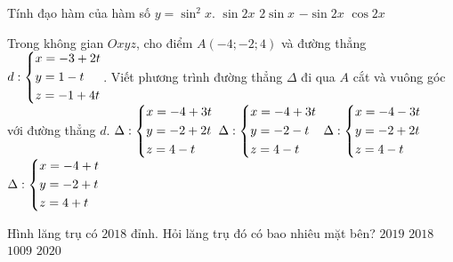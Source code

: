 \begin{ex}%
	Tính đạo hàm của hàm số $y=\sin^2x$.
	\choice
	{\True $\sin 2x$ }
	{ $2\sin x$}
	{ $-\sin 2x$}
	{ $\cos 2x$}
\end{ex}
\begin{ex}%
	Trong không gian $Oxyz$, cho điểm $A(-4; -2; 4)$ và đường thẳng $d:\left\{\begin{aligned}&x =-3 + 2t\\&y = 1 - t\\&
		z = -1 + 4t\end{aligned}\right.$. Viết phương trình đường thẳng $\Delta$ đi qua $A$ cắt và vuông góc với đường thẳng $d$.
	\choice
	{\True $\Delta: \left\{\begin{aligned}&
			x = -4 + 3t\\&
			y = -2 + 2t\\&
			z = 4 - t\end{aligned}\right.$ }
	{ $\Delta: \left\{\begin{aligned}&
			x = -4 + 3t\\&
			y = -2 - t\\&
			z = 4 - t\end{aligned}\right.$}
	{ $\Delta: \left\{\begin{aligned}&
			x = -4 - 3t\\&
			y = -2 + 2t\\&
			z = 4 - t\end{aligned}\right.$}
	{ $\Delta:\left\{\begin{aligned}&
			x = -4 + t\\&
			y = -2 + t\\&
			z = 4 + t\end{aligned}\right.$}
\end{ex}
\begin{ex}%
	Hình lăng trụ có $2018$ đỉnh. Hỏi lăng trụ đó có bao nhiêu mặt bên?
	\choice
	{ $2019$}
	{ $2018$}
	{\True $1009$}
	{ $2020$}
\end{ex}
